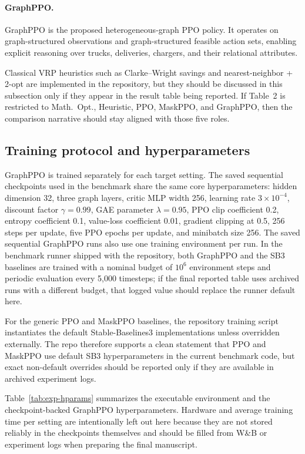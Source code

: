 \paragraph{GraphPPO.}
GraphPPO is the proposed heterogeneous-graph PPO policy. It operates on graph-structured observations and graph-structured feasible action sets, enabling explicit reasoning over trucks, deliveries, chargers, and their relational attributes.

Classical VRP heuristics such as Clarke--Wright savings and nearest-neighbor + 2-opt are implemented in the repository, but they should be discussed in this subsection only if they appear in the result table being reported. If Table~2 is restricted to Math.~Opt., Heuristic, PPO, MaskPPO, and GraphPPO, then the comparison narrative should stay aligned with those five roles.

\subsection{Training protocol and hyperparameters}
\label{sec:training-protocol}

GraphPPO is trained separately for each target setting. The saved sequential checkpoints used in the benchmark share the same core hyperparameters: hidden dimension 32, three graph layers, critic MLP width 256, learning rate $3\times 10^{-4}$, discount factor $\gamma=0.99$, GAE parameter $\lambda=0.95$, PPO clip coefficient 0.2, entropy coefficient 0.1, value-loss coefficient 0.01, gradient clipping at 0.5, 256 steps per update, five PPO epochs per update, and minibatch size 256. The saved sequential GraphPPO runs also use one training environment per run. In the benchmark runner shipped with the repository, both GraphPPO and the SB3 baselines are trained with a nominal budget of $10^6$ environment steps and periodic evaluation every 5{,}000 timesteps; if the final reported table uses archived runs with a different budget, that logged value should replace the runner default here.

For the generic PPO and MaskPPO baselines, the repository training script instantiates the default Stable-Baselines3 implementations unless overridden externally. The repo therefore supports a clean statement that PPO and MaskPPO use default SB3 hyperparameters in the current benchmark code, but exact non-default overrides should be reported only if they are available in archived experiment logs.

Table~\ref{tab:exp-hparams} summarizes the executable environment and the checkpoint-backed GraphPPO hyperparameters. Hardware and average training time per setting are intentionally left out here because they are not stored reliably in the checkpoints themselves and should be filled from W\&B or experiment logs when preparing the final manuscript.

